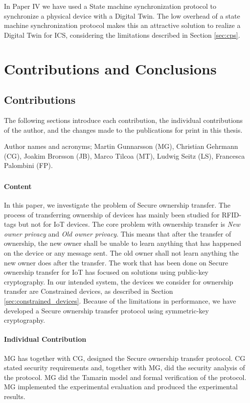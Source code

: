 In Paper IV we have used a State machine synchronization protocol to synchronize a physical device with a Digital Twin. The low overhead of a state machine synchronization protocol makes this an attractive solution to realize a Digital Twin for ICS, considering the limitations described in Section \ref{sec:cps}.

\chapter{Contributions and Conclusions}
\label{ch:coc}
\section{Contributions}
The following sections introduce each contribution, the individual contributions of the author, and the changes made to the publications for print in this thesis.

Author names and acronyms; Martin Gunnarsson (MG), Christian Gehrmann (CG), Joakim Brorsson (JB), Marco Tilcoa (MT), Ludwig Seitz (LS), Francesca Palombini (FP).

\subsection{\paperItitle}
\subsubsection{Content}
In this paper, we investigate the problem of Secure ownership transfer. The process of transferring ownership of devices has mainly been studied for RFID-tags but not for IoT devices. The core problem with ownership transfer is \emph{New owner privacy} and \emph{Old owner privacy}. This means that after the transfer of ownership, the new owner shall be unable to learn anything that has happened on the device or any message sent. The old owner shall not learn anything the new owner does after the transfer. 
The work that has been done on Secure ownership transfer for IoT has focused on solutions using public-key cryptography. 
In our intended system, the devices we consider for ownership transfer are Constrained devices, as described in Section \ref{sec:constrained_devices}. Because of the limitations in performance, we have developed a Secure ownership transfer protocol using symmetric-key cryptography.
\subsubsection{Individual Contribution}
MG has together with CG, designed the Secure ownership transfer protocol. CG stated security requirements and, together with MG, did the security analysis of the protocol. MG did the Tamarin model and formal verification of the protocol. MG implemented the experimental evaluation and produced the experimental results.
